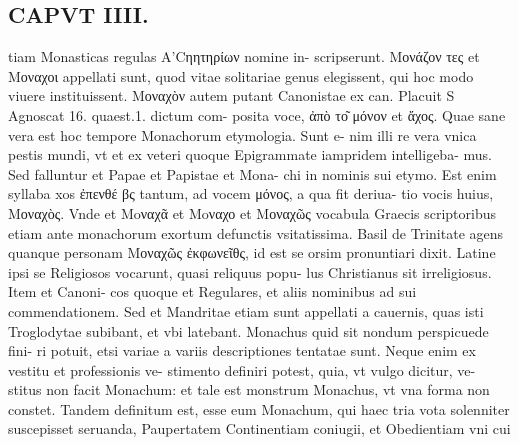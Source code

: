 \documentclass{article}
\begin{document}
\begin{pages}
\section*{CAPVT  IIII. }
\marginpar{[ p.213 ]}\pstart tiam Monasticas regulas A'Cηητηρίων nomine in- scripserunt. Μονάζον τες et Μοναχοι appellati sunt, quod vitae solitariae genus elegissent, qui hoc modo viuere instituissent. Μοναχὸν autem putant Canonistae ex can. Placuit S Agnoscat 16. quaest.1. dictum com- posita voce, ἀπὸ το͂ μόνον et ἄχος. Quae sane vera est hoc tempore Monachorum etymologia. Sunt e- nim illi re vera vnica pestis mundi, vt et ex veteri quoque Epigrammate iampridem intelligeba- mus. Sed falluntur et Papae et Papistae et Mona- chi in nominis sui etymo. Est enim syllaba xos ἐπενθέ βς tantum, ad vocem μόνος, a qua fit deriua- tio vocis huius, Μοναχὸς. Vnde et Moναχᾶ et Moναχο et Μοναχῶς vocabula Graecis scriptoribus etiam ante monachorum exortum defunctis vsitatissima. Basil de Trinitate agens quanque personam Μοναχῶς ἐκφωνεῖθς, id est se orsim pronuntiari dixit. Latine ipsi se Religiosos vocarunt, quasi reliquus popu- lus Christianus sit irreligiosus. Item et Canoni- cos quoque et Regulares, et aliis nominibus ad sui commendationem. Sed et Mandritae etiam sunt appellati a cauernis, quas isti Troglodytae subibant, et vbi latebant. Monachus quid sit nondum perspicuede fini- ri potuit, etsi variae a variis descriptiones tentatae sunt. Neque enim ex vestitu et professionis ve- stimento definiri potest, quia, vt vulgo dicitur, ve- stitus non facit Monachum: et tale est monstrum Monachus, vt vna forma non constet. Tandem definitum est, esse eum Monachum, qui haec tria vota solenniter suscepisset seruanda, Paupertatem Continentiam coniugii, et Obedientiam vni cui  \pend

\end{pages}
\end{document}

